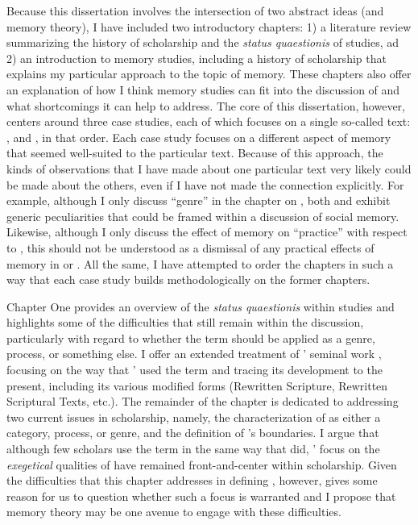 Because this dissertation involves the intersection of two abstract ideas (\rwb and memory theory), I have included two introductory chapters: 1) a literature review summarizing the history of scholarship and the \emph{status quaestionis} of \rwb studies, ad 2) an introduction to memory studies, including a history of scholarship that explains my particular approach to the topic of memory. These chapters also offer an explanation of how I think memory studies can fit into the discussion of \rwb and what shortcomings it can help to address. The core of this dissertation, however, centers around three case studies, each of which focuses on a single so-called \rwb text: \chronicles, \ga and \jub, in that order. Each case study focuses on a different aspect of memory that seemed well-suited to the particular text. Because of this approach, the kinds of observations that I have made about one particular text very likely could be made about the others, even if I have not made the connection explicitly. For example, although I only discuss ``genre'' in the chapter on \ga, both \chronicles and \jub exhibit generic peculiarities that could be framed within a discussion of social memory. Likewise, although I only discuss the effect of memory on ``practice'' with respect to \jub, this should not be understood as a dismissal of any practical effects of memory in \chronicles or \ga. All the same, I have attempted to order the chapters in such a way that each case study builds methodologically on the former chapters.

Chapter One provides an overview of the \emph{status quaestionis} within \rwb studies and highlights some of the difficulties that still remain within the discussion, particularly with regard to whether the term should be applied as a genre, process, or something else. I offer an extended treatment of \vermes' seminal work , focusing on the way that \vermes' used the term and tracing its development to the present, including its various modified forms (Rewritten Scripture, Rewritten Scriptural Texts, etc.). The remainder of the chapter is dedicated to addressing two current issues in \rwb scholarship, namely, the characterization of \rwb as either a category, process, or genre, and the definition of \rwb's boundaries. I argue that although few scholars use the term \rwb in the same way that \vermes did, \vermes' focus on the \emph{exegetical} qualities of \rwb have remained front-and-center within \rwb scholarship. Given the difficulties that this chapter addresses in defining \rwb, however, gives some reason for us to question whether such a focus is warranted and I propose that memory theory may be one avenue to engage with these difficulties.

